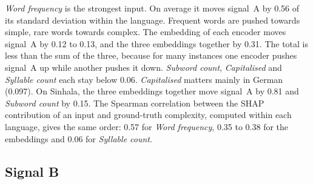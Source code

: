 \documentclass[11pt]{article}
\begin{document}
\emph{Word frequency} is the strongest input. On average it moves signal~A by 0.56 of its standard %
deviation within the language. Frequent words are pushed towards simple, rare words towards
complex. The embedding of each encoder moves signal~A by 0.12 to 0.13, and the three embeddings %
together by 0.31. The total is less than the sum of the three, because for many instances one %
encoder pushes signal~A up while another pushes it down. \emph{Subword count}, \emph{Capitalised} %
and \emph{Syllable count} each stay below 0.06. \emph{Capitalised} matters mainly in German %
(0.097). On Sinhala, the three embeddings together move signal~A by 0.81 and \emph{Subword count} %
by 0.15. The Spearman correlation between the SHAP contribution of an input and ground-truth %
complexity, computed within each language, gives the same order: 0.57 for \emph{Word frequency}, %
0.35 to 0.38 for the embeddings and 0.06 for \emph{Syllable count}.

\subsection{Signal B}
\label{sec:results-b}

\end{document}
